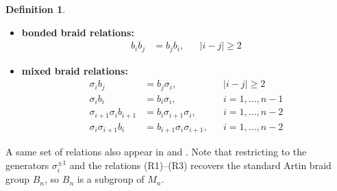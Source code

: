 \documentclass{article}
\theoremstyle{definition}
\newtheorem{definition}{Definition}[section]
\theoremstyle{plain}
\theoremstyle{remark}
\begin{document}
\begin{definition}
\begin{itemize}
    \item \textbf{bonded braid relations:}
    \begin{align*}
        b_i b_j &= b_j b_i, &&  |i-j| \geq 2 \tag{B1}
    \end{align*}

    \item \textbf{mixed braid relations:}
    \begin{align*}
        \sigma_i b_j &= b_j \sigma_i, &&  |i-j| \geq 2 \tag{M1} \\
        \sigma_i b_i &= b_i \sigma_i, &&  i = 1, \dots, n-1 \tag{M2} \\
        \sigma_{i+1} \sigma_i b_{i+1} &= b_i \sigma_{i+1} \sigma_i, &&  i = 1, \dots, n-2 \tag{M3} \\
        \sigma_i \sigma_{i+1} b_i &= b_{i+1} \sigma_i \sigma_{i+1}, &&  i = 1, \dots, n-2 \tag{M4}
    \end{align*}
\end{itemize}

A same set of relations also appear in \cite{kauffman1992link} and \cite{birman1993new}.
Note that restricting to the generators $ \sigma_i^{\pm1} $ and the relations \textnormal{(R1)–(R3)} recovers the standard Artin braid group $B_n$, so $B_n$ is a subgroup of $M_n$.
\end{definition}
\end{document}
